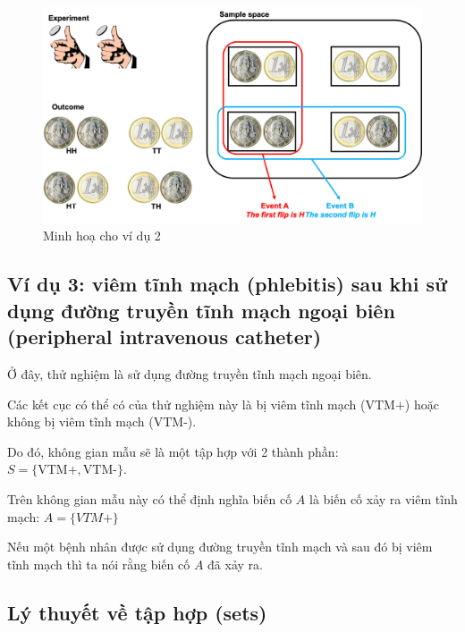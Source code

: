 \documentclass[
]{book}
\begin{document}
\begin{figure}

{\centering \includegraphics[width=1\linewidth]{figures/Picture02} 

}

\caption{Minh hoạ cho ví dụ 2}\label{fig:example2}
\end{figure}

\hypertarget{vuxed-dux1ee5-3-viuxeam-tux129nh-mux1ea1ch-phlebitis-sau-khi-sux1eed-dux1ee5ng-ux111ux1b0ux1eddng-truyux1ec1n-tux129nh-mux1ea1ch-ngoux1ea1i-biuxean-peripheral-intravenous-catheter}{%
\subsection{Ví dụ 3: viêm tĩnh mạch (phlebitis) sau khi sử dụng đường truyền tĩnh mạch ngoại biên (peripheral intravenous catheter)}\label{vuxed-dux1ee5-3-viuxeam-tux129nh-mux1ea1ch-phlebitis-sau-khi-sux1eed-dux1ee5ng-ux111ux1b0ux1eddng-truyux1ec1n-tux129nh-mux1ea1ch-ngoux1ea1i-biuxean-peripheral-intravenous-catheter}}

Ở đây, thử nghiệm là sử dụng đường truyền tĩnh mạch ngoại biên.

Các kết cục có thể có của thử nghiệm này là bị viêm tĩnh mạch (\(\text{VTM+}\)) hoặc không bị viêm tĩnh mạch (\(\text{VTM-}\)).

Do đó, không gian mẫu sẽ là một tập hợp với 2 thành phần: \(S = \{\text{VTM+},\text{VTM-}\}\).

Trên không gian mẫu này có thể định nghĩa biến cố \(A\) là biến cố xảy ra viêm tĩnh mạch: \(A = \{VTM+\}\)

Nếu một bệnh nhân được sử dụng đường truyền tĩnh mạch và sau đó bị viêm tĩnh mạch thì ta nói rằng biến cố \(A\) đã xảy ra.

\hypertarget{luxfd-thuyux1ebft-vux1ec1-tux1eadp-hux1ee3p-sets}{%
\subsection{Lý thuyết về tập hợp (sets)}\label{luxfd-thuyux1ebft-vux1ec1-tux1eadp-hux1ee3p-sets}}
\end{document}
